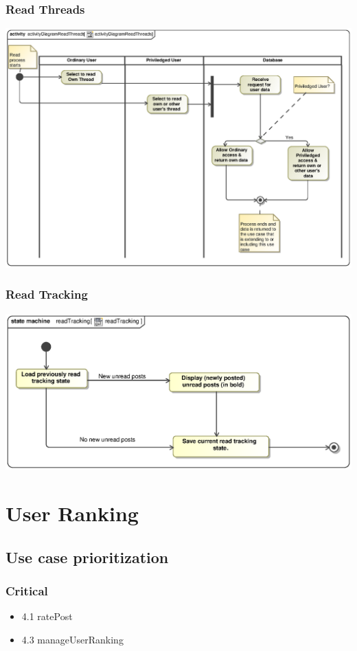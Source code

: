 \documentclass[hidelinks, 12pt, oneside]{article}
\begin{document}
\subsubsection{Read Threads}
\includegraphics[scale=.9]{Andreas/activityDiagramReadThreads.eps}\\

\subsubsection{Read Tracking}
\includegraphics[scale=.9]{Andreas/stateDiagramreadTracking.eps}\\

\section{User Ranking}
\subsection{Use case prioritization}
\subsubsection{Critical}
\begin{itemize}
  \item 4.1 ratePost
  \item 4.3 manageUserRanking
\end{itemize}
\end{document}
